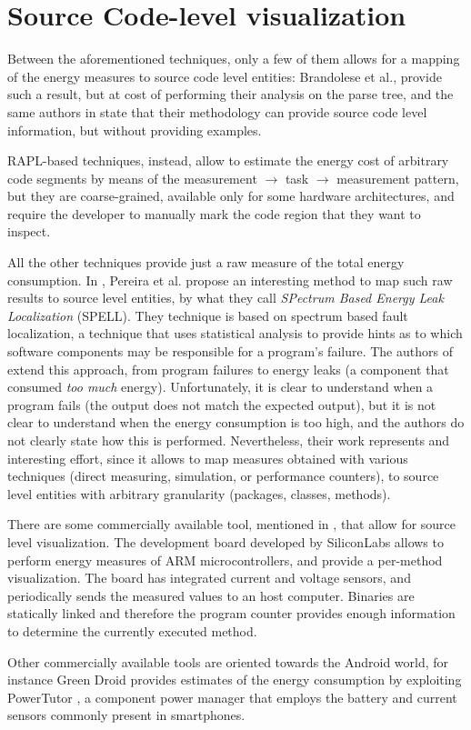 \section{Source Code-level visualization}

Between the aforementioned techniques, only a few of them allows for a mapping of the energy measures to source code level entities: Brandolese et al., \cite{brando2008} provide such a result, but at cost of performing their analysis on the parse tree, and the same authors in \cite{brando2011} state that their methodology can provide source code level information, but without providing examples. \par 
RAPL-based techniques, instead, allow to estimate the energy cost of arbitrary code segments by means of the measurement $\rightarrow$ task $\rightarrow$ measurement pattern, but they are coarse-grained, available only for some hardware architectures, and require the developer to manually mark the code region that they want to inspect. \par 
All the other techniques provide just a raw measure of the total energy consumption. In \cite{pereira}, Pereira et al. propose an interesting method to map such raw results to source level entities, by what they call \emph{SPectrum Based Energy Leak Localization} (SPELL). They technique is based on spectrum based fault localization, a technique that uses statistical analysis to provide hints as to which software components may be responsible for a program's failure. The authors of \cite{pereira} extend this approach, from program failures to energy leaks (a component that consumed \emph{too much} energy). Unfortunately, it is clear to understand when a program fails (the output does not match the expected output), but it is not clear to understand when the energy consumption is too high, and the authors do not clearly state how this is performed. Nevertheless, their work represents and interesting effort, since it allows to map measures obtained with various techniques (direct measuring, simulation, or performance counters), to source level entities with arbitrary granularity (packages, classes, methods). 
\par
There are some commercially available tool, mentioned in \cite{rieger}, that allow for source level visualization. The development board developed by SiliconLabs \cite{siliconlab} allows to perform energy measures of ARM microcontrollers, and provide a per-method visualization. The board has integrated current and voltage sensors, and periodically sends the measured values to an host computer. Binaries are statically linked and therefore the program counter provides enough information to determine the currently executed method. 
\par 
Other commercially available tools are oriented towards the Android world, for instance Green Droid \cite{greendroid} provides estimates of the energy consumption by exploiting PowerTutor \cite{powertutor}, a component power manager that employs the battery and current sensors commonly present in smartphones.

